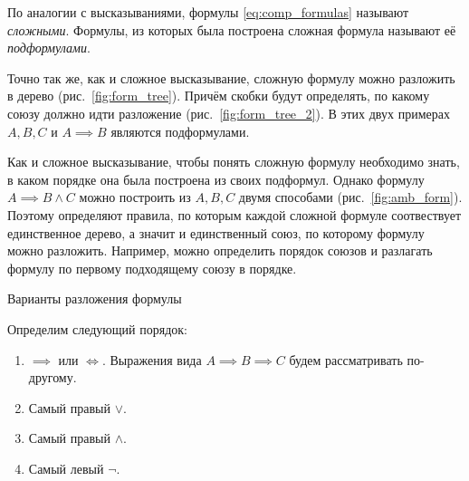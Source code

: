 По аналогии с высказываниями, формулы \eqref{eq:comp_formulas}
называют {\it сложными}.
Формулы, из которых была построена сложная формула
называют её {\it подформулами}.

Точно так же, как и сложное высказывание, сложную формулу можно
разложить в дерево (рис.~\ref{fig:form_tree}). Причём скобки будут
определять, по какому союзу должно идти разложение (рис.~\ref{fig:form_tree_2}).
В этих двух примерах $A,B,C$ и $A\implies B$ являются подформулами.

Как и сложное высказывание, чтобы понять сложную формулу
необходимо знать, в каком порядке она была построена из своих подформул.
Однако формулу $A\implies B\land C$ можно построить из $A,B,C$ двумя
способами (рис.~\ref{fig:amb_form}).
Поэтому определяют правила, по которым каждой сложной формуле
соотвествует единственное дерево, а значит и единственный союз,
по которому формулу можно разложить.
Например, можно определить порядок союзов и разлагать формулу по первому
подходящему союзу в порядке.

\begin{marginfigure}[-2cm]
  \begin{multicols}{2}

  \end{multicols}

  \caption{Варианты разложения формулы}\label{fig:amb_form}
\end{marginfigure}

Определим следующий порядок:
\begin{enumerate}
  \item{}$\implies$ или $\iff$. Выражения вида ${A\implies B\implies C}$
  будем рассматривать по-другому.
  \item{}Самый правый $\lor$.
  \item{}Самый правый $\land$.
  \item{}Самый левый $\lnot$.
\end{enumerate}

